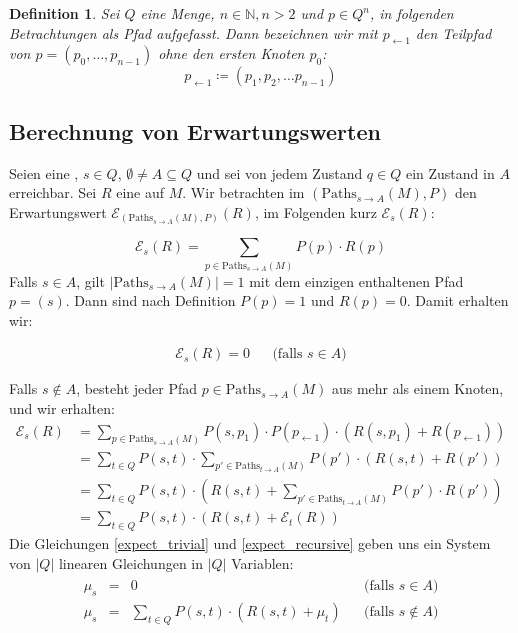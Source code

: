 \documentclass[a4paper]{article}
\newtheorem{definition}[satz]{Definition} %
\theoremstyle{nonumberplain}
\begin{document}
\begin{definition}
	Sei $Q$ eine Menge, $n\in \mathbb{N}, n>2$ und $p \in Q^n$, in folgenden Betrachtungen als Pfad aufgefasst. Dann bezeichnen wir mit $p_{\leftarrow 1}$ den Teilpfad von $p = (p_0, \dots, p_{n-1})$ ohne den ersten Knoten $p_0$:
	\begin{equation}
		p_{\leftarrow 1} \coloneqq (p_1,p_2, \dots p_{n-1})
	\end{equation}
\end{definition}

\subsection{Berechnung von Erwartungswerten}

Seien \mcex{} eine \mc{}, $s \in Q$, $\emptyset \neq A \subseteq Q$ und sei von jedem Zustand $q\in Q$ ein Zustand in $A$ erreichbar. Sei $R$ eine \reward{} auf $M$. Wir betrachten im \probspacen{} $(\mathrm{Paths}_{s \rightarrow A}(M), P)$ den Erwartungswert $\mathcal{E}_{(\mathrm{Paths}_{s \rightarrow A}(M), P)}(R)$, im Folgenden kurz $\mathcal{E}_{s}(R)$:

\begin{equation}
	\mathcal{E}_{s}(R) = \sum_{p \in \mathrm{Paths}_{s \rightarrow A}(M)}{P(p) \cdot R(p)} 
\end{equation}
Falls $s \in A$, gilt $|\mathrm{Paths}_{s \rightarrow A}(M)| = 1$ mit dem einzigen enthaltenen Pfad $p = (s)$. Dann sind nach Definition $P(p) = 1$ und $R(p) = 0$. Damit erhalten wir:

\begin{align}
	\mathcal{E}_{s}(R) = 0 && \text{(falls $s \in A$)}\label{expect_trivial}
\end{align}

Falls $s \notin A$, besteht jeder Pfad $p \in \mathrm{Paths}_{s \rightarrow A}(M)$ aus mehr als einem Knoten, und wir erhalten:
\begin{align}
	\mathcal{E}_{s}(R) & = \sum_{p \in \mathrm{Paths}_{s \rightarrow A}(M)}{P(s,p_1) \cdot P(p_{\leftarrow 1}) \cdot (R(s,p_1) + R(p_{\leftarrow 1}))} \\
	& = \sum_{t \in Q}{ P(s,t) \cdot \sum_{p' \in \mathrm{Paths}_{t \rightarrow A}(M)}{ P(p') \cdot (R(s,t) + R(p')) } } \\
	& = \sum_{t \in Q}{ P(s,t) \cdot \left(R(s,t) + \sum_{p' \in \mathrm{Paths}_{t \rightarrow A}(M)}{ P(p') \cdot R(p') } \right) } \\
	& = \sum_{t \in Q}{ P(s,t) \cdot \left(R(s,t) + \mathcal{E}_{t}(R) \right) } \label{expect_recursive}
\end{align}
Die Gleichungen \ref{expect_trivial} und \ref{expect_recursive} geben uns ein System von $|Q|$ linearen Gleichungen in $|Q|$ Variablen:
\begin{align}
\begin{aligned}
	\mu_{s} & = & 0 && \text{(falls $s \in A$)} \\
	\mu_{s} & = & \sum_{t \in Q}{ P(s,t) \cdot \left(R(s,t) + \mu_{t} \right) } && \text{(falls $s \notin A$)}
\end{aligned}\label{les-exp}
\end{align}
\end{document}
